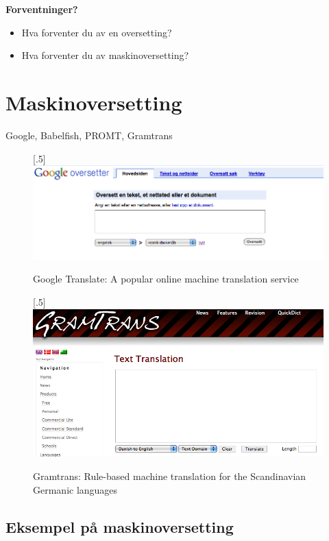 \documentclass[a4paper,english,12pt]{article}
\begin{document}
\begin{spacing}{1.0}
\textbf{Forventninger?}
 
\begin{itemize}
\item Hva forventer du av en oversetting?
\item Hva forventer du av maskinoversetting?
\end{itemize}


\section{Maskinoversetting}

Google, Babelfish, PROMT, Gramtrans


\begin{figure}
\scalebox{.5}[.5]{\includegraphics{google.png}} \\
  \caption{Google Translate: A popular online machine translation service}
\end{figure}
\begin{figure}
\scalebox{.5}[.5]{\includegraphics{gramtrans.png}}
  \caption{Gramtrans: Rule-based machine translation for the Scandinavian Germanic languages}
\end{figure}

\subsection{Eksempel på maskinoversetting}


\end{spacing}
\end{document}
